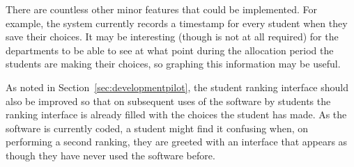 There are countless other minor features that could be implemented. For
example, the system currently records a timestamp for every student when they
save their choices. It may be interesting (though is not at all required) for
the departments to be able to see at what point during the allocation period
the students are making their choices, so graphing this information may be
useful.

As noted in Section~\ref{sec:developmentpilot}, the student ranking interface
should also be improved so that on subsequent uses of the software by students
the ranking interface is already filled with the choices the student has made.
As the software is currently coded, a student might find it confusing when, on
performing a second ranking, they are greeted with an interface that appears
as though they have never used the software before.
